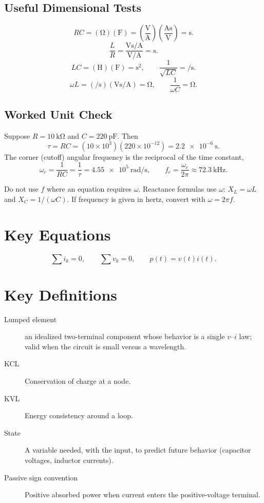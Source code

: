 \subsection{Useful Dimensional Tests}
\begin{unitsbox}
\[
RC=(\si{\ohm})(\si{\farad})
=\left(\frac{\si{\volt}}{\si{\ampere}}\right)
\left(\frac{\si{\ampere\second}}{\si{\volt}}\right)
=\si{\second}.
\]
\[
\frac{L}{R}
=\frac{\si{\volt\second\per\ampere}}{\si{\volt\per\ampere}}
=\si{\second}.
\]
\[
LC=(\si{\henry})(\si{\farad})=\si{\second\squared},
\qquad
\frac{1}{\sqrt{LC}}=\si{\per\second}.
\]
\[
\omega L=(\si{\per\second})(\si{\volt\second\per\ampere})
=\si{\ohm},
\qquad
\frac{1}{\omega C}=\si{\ohm}.
\]
\end{unitsbox}

\subsection{Worked Unit Check}
Suppose \(R=\SI{10}{\kilo\ohm}\) and \(C=\SI{220}{\pico\farad}\). Then
\[
\tau=RC=(10\times10^3)(220\times10^{-12})=\SI{2.2e-6}{\second}.
\]
The corner (cutoff) angular frequency is the reciprocal of the time constant,
\[
\omega_c=\frac{1}{RC}=\frac{1}{\tau}=\SI{4.55e5}{\radian\per\second},
\qquad
f_c=\frac{\omega_c}{2\pi}\approx \SI{72.3}{\kilo\hertz}.
\]

\begin{mistakebox}
Do not use \(f\) where an equation requires \(\omega\). Reactance formulas use
\(\omega\): \(X_L=\omega L\) and \(X_C=1/(\omega C)\). If frequency is given in
hertz, convert with \(\omega=2\pi f\).
\end{mistakebox}

\section{Key Equations}
\[
\sum i_k=0,\qquad \sum v_k=0,\qquad
p(t)=v(t)i(t).
\]

\section{Key Definitions}
\begin{description}
\item[Lumped element] an idealized two-terminal component whose behavior is a
single \(v\)--\(i\) law; valid when the circuit is small versus a wavelength.
\item[KCL] Conservation of charge at a node.
\item[KVL] Energy consistency around a loop.
\item[State] A variable needed, with the input, to predict future behavior
(capacitor voltages, inductor currents).
\item[Passive sign convention] Positive absorbed power when current enters the
positive-voltage terminal.
\end{description}
